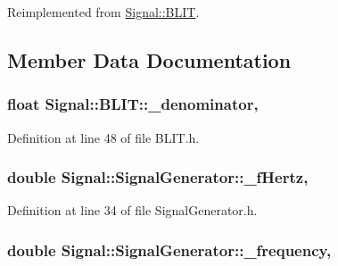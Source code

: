 Reimplemented from \hyperlink{class_signal_1_1_b_l_i_t_a420e1540ee223244fe1af28b7527d41c}{Signal\+::\+B\+L\+I\+T}.



\subsection{Member Data Documentation}
\hypertarget{class_signal_1_1_b_l_i_t_a0219d8bf4a3c9ba979824ae269363885}{
\subsubsection[{\+\_\+denominator}]{\setlength{\rightskip}{0pt plus 5cm}float Signal\+::\+B\+L\+I\+T\+::\+\_\+denominator\hspace{0.3cm}{\ttfamily [protected]}, {\ttfamily [inherited]}}}\label{class_signal_1_1_b_l_i_t_a0219d8bf4a3c9ba979824ae269363885}


Definition at line 48 of file B\+L\+I\+T.\+h.

\hypertarget{class_signal_1_1_signal_generator_a85a4702347352bab1c71e0a8df8437d6}{
\subsubsection[{\+\_\+f\+Hertz}]{\setlength{\rightskip}{0pt plus 5cm}double Signal\+::\+Signal\+Generator\+::\+\_\+f\+Hertz\hspace{0.3cm}{\ttfamily [protected]}, {\ttfamily [inherited]}}}\label{class_signal_1_1_signal_generator_a85a4702347352bab1c71e0a8df8437d6}


Definition at line 34 of file Signal\+Generator.\+h.

\hypertarget{class_signal_1_1_signal_generator_a7f107461333bce68c5dad412db96a8c2}{
\subsubsection[{\+\_\+frequency}]{\setlength{\rightskip}{0pt plus 5cm}double Signal\+::\+Signal\+Generator\+::\+\_\+frequency\hspace{0.3cm}{\ttfamily [protected]}, {\ttfamily [inherited]}}}\label{class_signal_1_1_signal_generator_a7f107461333bce68c5dad412db96a8c2}



